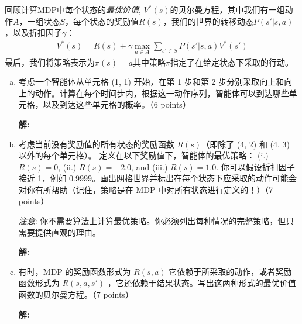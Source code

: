 \documentclass[8pt]{article}
\begin{document}
回顾计算MDP中每个状态的\textit{最优价值}, $V^{*}(s)$的贝尔曼方程，其中我们有一组动作$A$，一组状态$S$，每个状态的奖励值$R(s)$，我们的世界的转移动态$P(s' | s, a)$，以及折扣因子$\gamma$：
\begin{align*}
V^{*}(s) = R(s) + \gamma \max_{a \in A} \sum_{s' \in S} P(s' | s, a) V^{*}(s')
\end{align*}
最后，我们将策略表示为$\pi(s) = a$其中策略$\pi$指定了在给定状态下采取的行动。

\begin{enumerate}[(a)]
\item 
考虑一个智能体从单元格 (1, 1) 开始，在第 1 步和第 2 步分别采取向上和向上的动作。计算在每个时间步内，根据这一动作序列，智能体可以到达哪些单元格，以及到达这些单元格的概率。（6 points）

        
\textbf{\large 解:}
\vspace{3em}



\item
考虑当前没有奖励值的所有状态的奖励函数 $R(s)$（即除了 (4, 2) 和 (4, 3) 以外的每个单元格）。 定义在以下奖励值下，智能体的最优策略： (i.) $R(s) = 0$, (ii.) $R(s) = -2.0$, and (iii.) $R(s) = 1.0$. 你可以假设折扣因子接近 1，例如 0.9999。画出网格世界并标出在每个状态下应采取的动作可能会对你有所帮助（记住，策略是在 MDP 中对所有状态进行定义的！）（7 points）

\emph{注意}: 你不需要算法上计算最优策略。你必须列出每种情况的完整策略，但只需要提供直观的理由。
        
\textbf{\large 解:}
\vspace{3em}



\item
有时，MDP 的奖励函数形式为 $R(s, a)$ 它依赖于所采取的动作，或者奖励函数形式为 $R(s, a, s')$ ，它还依赖于结果状态。写出这两种形式的最优价值函数的贝尔曼方程。（7 points）
        
\textbf{\large 解:}
\vspace{3em}



\end{enumerate}
\end{document}
